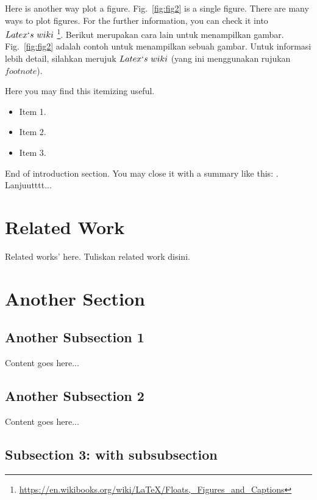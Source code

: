 \documentclass[preprint]{elsarticle}
\begin{document}
Here is another way plot a figure. Fig.~\ref{fig:fig2} is a single figure. There are many ways to plot figures. For the further information, you can check it into $Latex \lq s~wiki$ \footnote{\label{note:latex_wiki_figures}\url{https://en.wikibooks.org/wiki/LaTeX/Floats,_Figures_and_Captions}}. Berikut merupakan cara lain untuk menampilkan gambar. Fig.~\ref{fig:fig2} adalah contoh untuk menampilkan sebuah gambar. Untuk informasi lebih detail, silahkan merujuk $Latex \lq s~wiki$ \footnotemark[\ref{note:latex_wiki_figures}] (yang ini menggunakan rujukan $footnote$). 

Here you may find this itemizing useful.
\begin{itemize}
  \item Item 1.
  \item Item 2.
  \item Item 3.
\end{itemize}

End of introduction section. You may close it with a summary like this: . Lanjuutttt...

\section{Related Work}
Related works' here. Tuliskan related work disini.
    
\section{Another Section}

\subsection{Another Subsection 1}
Content goes here... 

\subsection{Another Subsection 2}
Content goes here... 

\subsection{Subsection 3: with subsubsection}
\end{document}
